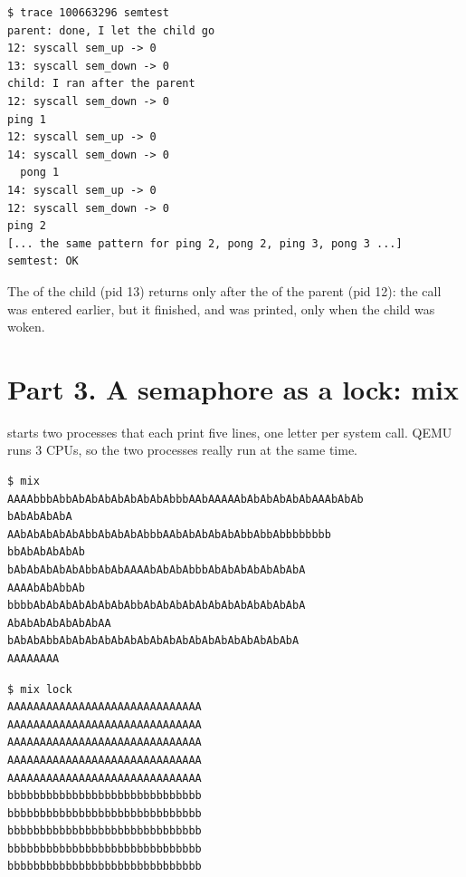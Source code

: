 \documentclass[11pt,a4paper]{article}
\begin{document}
\begin{lstlisting}[caption={The semaphore calls of semtest, seen with trace}]
$ trace 100663296 semtest
parent: done, I let the child go
12: syscall sem_up -> 0
13: syscall sem_down -> 0
child: I ran after the parent
12: syscall sem_down -> 0
ping 1
12: syscall sem_up -> 0
14: syscall sem_down -> 0
  pong 1
14: syscall sem_up -> 0
12: syscall sem_down -> 0
ping 2
[... the same pattern for ping 2, pong 2, ping 3, pong 3 ...]
semtest: OK
\end{lstlisting}

The  of the child (pid 13) returns only after the  of the parent
(pid 12): the call was entered earlier, but it finished, and was printed, only when the child
was woken.

\section{Part 3. A semaphore as a lock: mix}

 starts two processes that each print five lines, one letter per 
system call. QEMU runs 3 CPUs, so the two processes really run at the same time.

\begin{lstlisting}[caption={mix without the lock}]
$ mix
AAAAbbbAbbAbAbAbAbAbAbAbAbbbAAbAAAAAbAbAbAbAbAbAAAbAbAb
bAbAbAbAbA
AAbAbAbAbAbAbbAbAbAbAbbbAAbAbAbAbAbAbbAbbAbbbbbbbb
bbAbAbAbAbAb
bAbAbAbAbAbAbbAbAbAAAAbAbAbAbbbAbAbAbAbAbAbAbA
AAAAbAbAbbAb
bbbbAbAbAbAbAbAbAbAbbAbAbAbAbAbAbAbAbAbAbAbAbA
AbAbAbAbAbAbAbAA
bAbAbAbbAbAbAbAbAbAbAbAbAbAbAbAbAbAbAbAbAbAbA
AAAAAAAA
\end{lstlisting}

\begin{lstlisting}[caption={mix with the lock}]
$ mix lock
AAAAAAAAAAAAAAAAAAAAAAAAAAAAAA
AAAAAAAAAAAAAAAAAAAAAAAAAAAAAA
AAAAAAAAAAAAAAAAAAAAAAAAAAAAAA
AAAAAAAAAAAAAAAAAAAAAAAAAAAAAA
AAAAAAAAAAAAAAAAAAAAAAAAAAAAAA
bbbbbbbbbbbbbbbbbbbbbbbbbbbbbb
bbbbbbbbbbbbbbbbbbbbbbbbbbbbbb
bbbbbbbbbbbbbbbbbbbbbbbbbbbbbb
bbbbbbbbbbbbbbbbbbbbbbbbbbbbbb
bbbbbbbbbbbbbbbbbbbbbbbbbbbbbb
\end{lstlisting}
\end{document}
